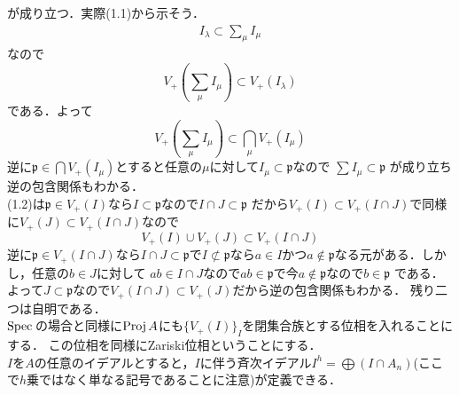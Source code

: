 が成り立つ．実際(1.1)から示そう．
\begin{align*}
  I_{\lambda} \subset \sum_{\mu}I_{\mu}
\end{align*}
なので
\begin{equation*}
  V_{+}(\sum_{\mu}I_{\mu}) \subset V_{+}(I_{\lambda})
\end{equation*}
である．よって
\begin{equation*}
  V_{+}(\sum_{\mu}I_{\mu}) \subset \bigcap_{\mu}V_{+}(I_{\mu})
\end{equation*}
逆に$\mathfrak{p} \in \bigcap V_{+}(I_{\mu})$とすると任意の$\mu$に対して$I_{\mu} \subset \mathfrak{p}$なので
$\sum I_{\mu}\subset \mathfrak{p}$ が成り立ち逆の包含関係もわかる．\\
(1.2)は$\mathfrak{p} \in V_{+}(I)$なら$I \subset \mathfrak{p}$なので$I\cap J \subset \mathfrak{p}$
だから$V_{+}(I)\subset V_{+}(I\cap J)$で同様に$V_{+}(J) \subset V_{+}(I\cap J)$なので
\begin{equation*}
  V_{+}(I)\cup V_{+}(J) \subset V_{+}(I\cap J)
\end{equation*}
逆に$\mathfrak{p} \in V_{+}(I\cap J)$なら$I\cap J \subset \mathfrak{p}$で$I\not\subset \mathfrak{p}$なら$a\in I$かつ$a\notin \mathfrak{p}$なる元がある．しかし，任意の$b\in J$に対して
$ab \in I\cap J$なので$ab \in \mathfrak{p}$で今$a\notin \mathfrak{p}$なので$b\in \mathfrak{p}$
である．よって$J\subset \mathfrak{p}$なので$V_{+}(I\cap J)\subset V_{+}(J)$だから逆の包含関係もわかる．
残り二つは自明である．\\
$\spec$の場合と同様に$\mathrm{Proj}\, A$にも$\{V_{+}(I)\}_{I}$を閉集合族とする位相を入れることにする．
この位相を同様にZariski位相ということにする．\\
$I$を$A$の任意のイデアルとすると，$I$に伴う斉次イデアル$I^{h} = \bigoplus(I\cap A_{n})$(ここで$h$乗ではなく単なる記号であることに注意)が定義できる．
